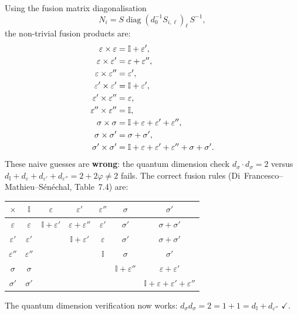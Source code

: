 \begin{computation}
\label{comp:tricritical-fusion}

Using the fusion matrix diagonalisation
\[
N_i = S \operatorname{diag}(d_0^{-1}S_{i,\ell})_\ell\, S^{-1},
\]
the non-trivial fusion products are:
\begin{align}
\varepsilon \times \varepsilon &= \mathbb{I} + \varepsilon',
\label{eq:tri-eps-eps} \\
\varepsilon \times \varepsilon' &= \varepsilon + \varepsilon'',
\label{eq:tri-eps-epsp} \\
\varepsilon \times \varepsilon'' &= \varepsilon',
\label{eq:tri-eps-epspp} \\
\varepsilon' \times \varepsilon' &= \mathbb{I} + \varepsilon',
\label{eq:tri-epsp-epsp} \\
\varepsilon' \times \varepsilon'' &= \varepsilon,
\label{eq:tri-epsp-epspp} \\
\varepsilon'' \times \varepsilon'' &= \mathbb{I},
\label{eq:tri-epspp-epspp} \\
\sigma \times \sigma &= \mathbb{I} + \varepsilon + \varepsilon'
+ \varepsilon'', \notag \\
\sigma \times \sigma' &= \sigma + \sigma', \notag \\
\sigma' \times \sigma' &= \mathbb{I} + \varepsilon + \varepsilon'
+ \varepsilon'' + \sigma + \sigma'. \notag
\end{align}
These naive guesses are \textbf{wrong}: the quantum dimension check
$d_\sigma \cdot d_\sigma = 2$ versus
$d_{\mathbb{I}} + d_\varepsilon + d_{\varepsilon'} + d_{\varepsilon''} = 2 + 2\varphi \neq 2$
fails. The correct fusion rules
(Di~Francesco--Mathieu--S\'en\'echal, Table~7.4) are:
\begin{center}
\renewcommand{\arraystretch}{1.2}
\begin{tabular}{c|cccccc}
$\times$ & $\mathbb{I}$ & $\varepsilon$ & $\varepsilon'$ & $\varepsilon''$ & $\sigma$ & $\sigma'$ \\
\hline
$\varepsilon$ & $\varepsilon$ & $\mathbb{I}+\varepsilon'$ & $\varepsilon+\varepsilon''$ & $\varepsilon'$ & $\sigma'$ & $\sigma+\sigma'$ \\
$\varepsilon'$ & $\varepsilon'$ & & $\mathbb{I}+\varepsilon'$ & $\varepsilon$ & $\sigma'$ & $\sigma+\sigma'$ \\
$\varepsilon''$ & $\varepsilon''$ & & & $\mathbb{I}$ & $\sigma$ & $\sigma'$ \\
$\sigma$ & $\sigma$ & & & & $\mathbb{I}+\varepsilon''$ & $\varepsilon+\varepsilon'$ \\
$\sigma'$ & $\sigma'$ & & & & & $\mathbb{I}+\varepsilon+\varepsilon'+\varepsilon''$ \\
\end{tabular}
\end{center}
The quantum dimension verification now works:
$d_\sigma d_\sigma = 2 = 1 + 1 = d_{\mathbb{I}} + d_{\varepsilon''}$ $\checkmark$.
\end{computation}


